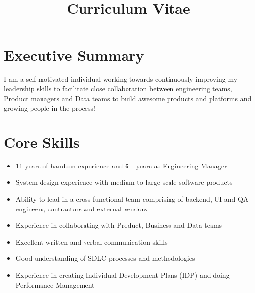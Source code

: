 \documentclass[11pt,a4paper,sans]{moderncv} %
\title{Curriculum Vitae}
\begin{document}
\makecvtitle %

\section{Executive Summary}
I am a self motivated individual working towards continuously improving my leadership skills to facilitate close collaboration between engineering teams, Product managers and Data teams to build awesome products and platforms and growing people in the process!

\section{Core Skills}
\begin{multicols}{2}
    \begin{itemize}
        \item 11 years of handson experience and 6+ years as Engineering Manager
        \item System design experience with medium to large scale software products
        \item Ability to lead in a cross-functional team comprising of backend, UI and QA engineers, contractors and external vendors
        \item Experience in collaborating with Product, Business and Data teams
        \item Excellent written and verbal communication skills
        \item Good understanding of SDLC processes and methodologies
        \item Experience in creating Individual Development Plans (IDP) and doing Performance Management
    \end{itemize}
\end{multicols}

\end{document}
